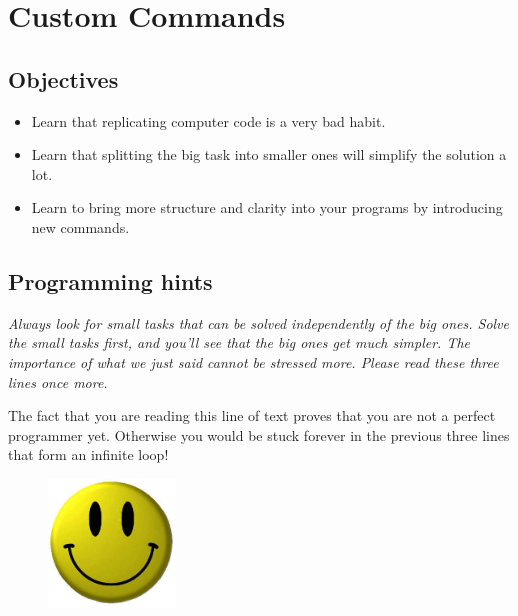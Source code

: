 
\section{Custom Commands} \label{sec:newcom}

\subsection{Objectives} 
 
\begin{itemize}
\item Learn that replicating computer code is a very bad habit.
\item Learn that splitting the big task into smaller ones will simplify the solution a lot. 
\item Learn to bring more structure and clarity into your programs by introducing new commands.
\end{itemize}

\subsection{Programming hints}

{\em Always look for small tasks that can be solved independently of the big ones.
Solve the small tasks first, and you'll see that the big ones get much simpler. The 
importance of what we just said cannot be stressed more. Please read these three 
lines once more.}

\noindent
The fact that you are reading this line of text proves that you are not 
a perfect programmer yet. Otherwise you would be stuck forever in the 
previous three lines that form an infinite loop!

\begin{figure}[!ht]
\begin{center}
\includegraphics[width=0.3\textwidth]{imgk/smiley.png}
\end{center}
\vspace{-1cm}
\end{figure}

